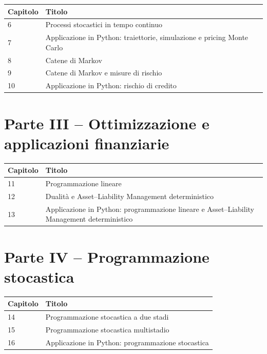 \documentclass[oneside,openany]{memoir}%
\newcommand{\1}{\mathbf{1}}
\begin{document}
\begin{center}%
\begin{tabular}
[c]{ll}\hline
Capitolo & Titolo\\\hline
6 & Processi stocastici in tempo continuo\\
7 & Applicazione in Python: traiettorie, simulazione e pricing Monte Carlo\\
8 & Catene di Markov\\
9 & Catene di Markov e misure di rischio\\
10 & Applicazione in Python: rischio di credito\\\hline
\end{tabular}



\end{center}

\section*{Parte III -- Ottimizzazione e applicazioni finanziarie}

\begin{center}%
\begin{tabular}
[c]{ll}\hline
Capitolo & Titolo\\\hline
11 & Programmazione lineare\\
12 & Dualit\`a e Asset--Liability Management deterministico\\
13 & Applicazione in Python: programmazione lineare e Asset--Liability
Management deterministico\\\hline
\end{tabular}
\end{center}

\section*{Parte IV -- Programmazione stocastica}

\begin{center}%
\begin{tabular}
[c]{ll}\hline
Capitolo & Titolo\\\hline
14 & Programmazione stocastica a due stadi\\
15 & Programmazione stocastica multistadio\\
16 & Applicazione in Python: programmazione stocastica\\\hline
\end{tabular}

\end{center}
\end{document}
